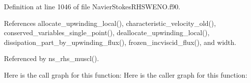 Definition at line 1046 of file Navier\+Stokes\+R\+H\+S\+W\+E\+N\+O.\+f90.



References allocate\+\_\+upwinding\+\_\+local(), characteristic\+\_\+velocity\+\_\+old(), conserved\+\_\+variables\+\_\+single\+\_\+point(), deallocate\+\_\+upwinding\+\_\+local(), dissipation\+\_\+part\+\_\+by\+\_\+upwinding\+\_\+flux(), frozen\+\_\+incviscid\+\_\+flux(), and width.



Referenced by ns\+\_\+rhs\+\_\+muscl().

Here is the call graph for this function\+:
Here is the caller graph for this function\+:
\hypertarget{namespacenavierstokesrhsweno_a99ebd5b1eaad99cba4958c639554bb7c}{}\label{namespacenavierstokesrhsweno_a99ebd5b1eaad99cba4958c639554bb7c} 
